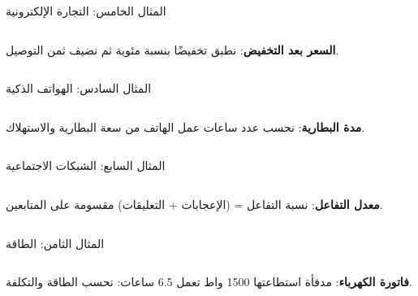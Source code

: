 \begin{frame}[t]{المثال الخامس: التجارة الإلكترونية}
    \begin{columns}[T]
        {\small\textbf{السعر بعد التخفيض}: نطبق تخفيضًا بنسبة مئوية ثم نضيف ثمن التوصيل.\par}
        \vspace{0.3cm}
    \end{columns}
\end{frame}

\begin{frame}[t]{المثال السادس: الهواتف الذكية}
    \begin{columns}[T]
        {\small\textbf{مدة البطارية}: نحسب عدد ساعات عمل الهاتف من سعة البطارية والاستهلاك.\par}
        \vspace{0.3cm}
    \end{columns}
\end{frame}

\begin{frame}[t]{المثال السابع: الشبكات الاجتماعية}
    \begin{columns}[T]
        {\small\textbf{معدل التفاعل}: نسبة التفاعل = (الإعجابات + التعليقات) مقسومة على المتابعين.\par}
        \vspace{0.3cm}
    \end{columns}
\end{frame}

\begin{frame}[t]{المثال الثامن: الطاقة}
    \begin{columns}[T]
        {\small\textbf{فاتورة الكهرباء}: مدفأة استطاعتها 1500 واط تعمل 6.5 ساعات: نحسب الطاقة والتكلفة.\par}
        \vspace{0.3cm}
    \end{columns}
\end{frame}

